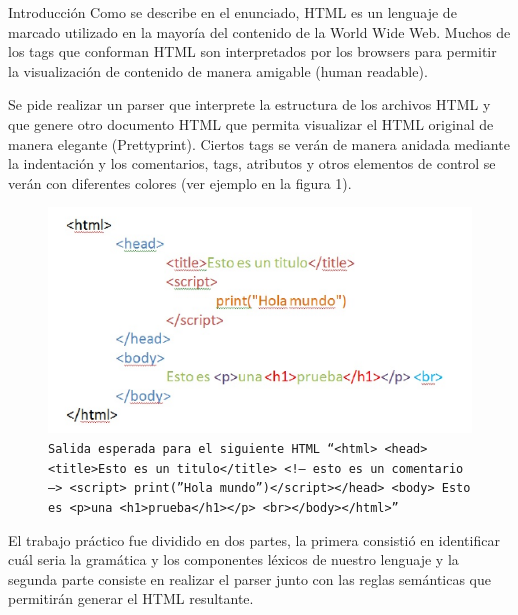\documentclass[a4paper,8pt]{article}
\begin{document}
\begin{section}{Introducción}
Como se describe en el enunciado, HTML es un lenguaje de marcado utilizado en la mayoría del contenido de la World Wide Web.
Muchos de los tags que conforman HTML son interpretados por los browsers para permitir la visualización de contenido de manera amigable (human readable). 

Se pide realizar un parser que interprete la estructura de los archivos HTML y que genere otro documento HTML que permita visualizar el HTML original de manera elegante (Prettyprint). Ciertos tags se verán de manera anidada mediante la indentación y los comentarios, tags, atributos y otros elementos de control se verán con diferentes colores (ver ejemplo en la figura 1).

\begin{figure}[h!]
  \centering
  \includegraphics[scale=0.70]{salida.png}
  \caption{\texttt{Salida esperada para el siguiente HTML ``$<html> <head><title>Esto es un titulo</title> <!– esto es un comentario –> <script> print(”Hola mundo”)</script></head> <body> Esto es <p>una <h1>prueba</h1></p> <br></body></html>$''}}
\end{figure}

El trabajo práctico fue dividido en dos partes, la primera consistió en identificar cuál seria la gramática y los componentes léxicos de nuestro lenguaje y la segunda parte consiste en realizar el parser junto con las reglas semánticas que permitirán generar el HTML resultante.
 


\end{section}
\newpage
\end{document}
